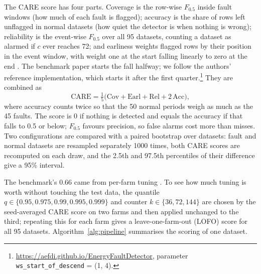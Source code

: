 \documentclass[conference]{IEEEtran}
\begin{document}
The CARE score \cite{r12} has four parts. Coverage is the row-wise $F_{0.5}$ inside fault windows (how much of each fault is flagged); accuracy is the share of rows left unflagged in normal datasets (how quiet the detector is when nothing is wrong); reliability is the event-wise $F_{0.5}$ over all 95 datasets, counting a dataset as alarmed if $c$ ever reaches 72; and earliness weights flagged rows by their position in the event window, with weight one at the start falling linearly to zero at the end \cite{r12,r27}. The benchmark paper starts the fall halfway; we follow the authors' reference implementation, which starts it after the first quarter.\footnote{\url{https://aefdi.github.io/EnergyFaultDetector}, parameter \texttt{ws\_start\_of\_descend} = (1, 4).} They are combined as
\begin{equation}
\mathrm{CARE}=\tfrac{1}{5}\big(\mathrm{Cov}+\mathrm{Earl}+\mathrm{Rel}+2\,\mathrm{Acc}\big),
\end{equation}
where accuracy counts twice so that the 50 normal periods weigh as much as the 45 faults. The score is 0 if nothing is detected and equals the accuracy if that falls to 0.5 or below; $F_{0.5}$ favours precision, so false alarms cost more than misses. Two configurations are compared with a paired bootstrap over datasets: fault and normal datasets are resampled separately 1000 times, both CARE scores are recomputed on each draw, and the 2.5th and 97.5th percentiles of their difference give a 95\% interval.

The benchmark's 0.66 came from per-farm tuning \cite{r12}. To see how much tuning is worth without touching the test data, the quantile $q\in\{0.95,0.975,0.99,0.995,0.999\}$ and counter $k\in\{36,72,144\}$ are chosen by the seed-averaged CARE score on two farms and then applied unchanged to the third; repeating this for each farm gives a leave-one-farm-out (LOFO) score for all 95 datasets. Algorithm~\ref{alg:pipeline} summarises the scoring of one dataset.
\end{document}
